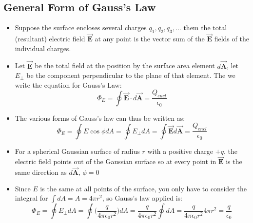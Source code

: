 \documentclass[11pt, a4paper]{article}
\begin{document}
\subsection{General Form of Gauss's Law}
\begin{itemize}
    \item Suppose the surface encloses several charges $q_1, q_2, q_3, ... $ them the
        total (resultant) electric field $\vec{\mathbf{E}}$ at any point is the vector
        sum of the $\vec{\mathbf{E}}$ fields of the individual charges.
    \item Let $\vec{\mathbf{E}}$ be the total field at the position by the surface area
        element $d \vec{\mathbf{A}}$, let $E_\perp$ be the component perpendicular to the
        plane of that element. The we write the equation for Gauss's Law:
        \begin{equation}
            \Phi_E = \oint \vec{\mathbf{E}} \cdot d \vec{\mathbf{A}} =
            \frac{Q_{encl}}{\epsilon_0}
        \end{equation}
    \item The various forms of Gauss's law can thus be written as:
        \begin{equation}
            \Phi_E = \oint E\cos\phi dA = \oint E_\perp dA =
            \oint \vec{\mathbf{E}} d \vec{\mathbf{A}} = \frac{Q_{encl}}{\epsilon_0}
        \end{equation}
    \item For a spherical Gaussian surface of radius $r$ with a positive charge $+q$, the
        electric field points out of the Gaussian surface so at every point in
        $\vec{\mathbf{E}}$ is the same direction as $d \vec{\mathbf{A}}$, $\phi = 0$
    \item Since $E$ is the same at all points of the surface, you only have to consider
        the integral for $\int dA = A = 4\pi r^2$, so Gauss's law applied is:
        \begin{equation}
            \Phi_E = \oint E_\perp dA = \oint\bigg(\frac{q}{4\pi\epsilon_0 r^2} \bigg) dA
            = \frac{q}{4\pi\epsilon_0 r^2}\oint dA =
            \frac{q}{4\pi\epsilon_0 r^2} 4\pi r^2 = \frac{q}{\epsilon_0}
        \end{equation}
\end{itemize}
\end{document}
